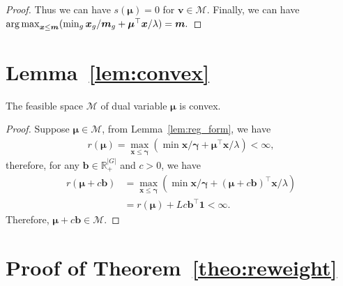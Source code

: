 \begin{proof}
Thus we can have $s(\bm{\mu}) = 0$ for $\mathbf{v}\in\mathcal{M}$. Finally, we can have 
$
    \operatorname*{arg\,max}_{\bm{x}\leq \bm{m}} (\min_g {\bm{x}_g}/\bm{m}_g+\bm{\mu}^{\top}\bm{x}/\lambda)=\bm{m}.
$



    
\end{proof}

\section{Lemma~\ref{lem:convex}}
\begin{lemma}\label{lem:convex}
The feasible space $\mathcal{M}$ of dual variable $\bm{\mu}$ is convex.
\end{lemma}

\begin{proof}
    Suppose $\bm{\mu}\in\mathcal{M}$, from Lemma~\ref{lem:reg_form}, we have
    \begin{align*}
       r(\bm{\mu}) = \max_{\bm{x}\leq \bm{\gamma}} (\min {\bm{x}}/\bm{\gamma}+\bm{\mu}^{\top}\bm{x}/\lambda) < \infty,
    \end{align*}
    therefore, for any $\bm{b}\in\mathbb{R}_{+}^{|G|}$ and $c>0$, we have
    \begin{align*}
       r(\bm{\mu}+c\bm{b}) &= \max_{\bm{x}\leq \bm{\gamma}} (\min {\bm{x}}/\bm{\gamma}+(\bm{\mu}+c\bm{b})^{\top}\bm{x}/\lambda) \\
       &=r(\bm{\mu}) + Lc\bm{b}^{\top}\bm{1} < \infty.
    \end{align*}
    Therefore, $\bm{\mu}+c\bm{b}\in\mathcal{M}$.
\end{proof}

\section{Proof of Theorem~\ref{theo:reweight}}\label{app:prof_reweight}


